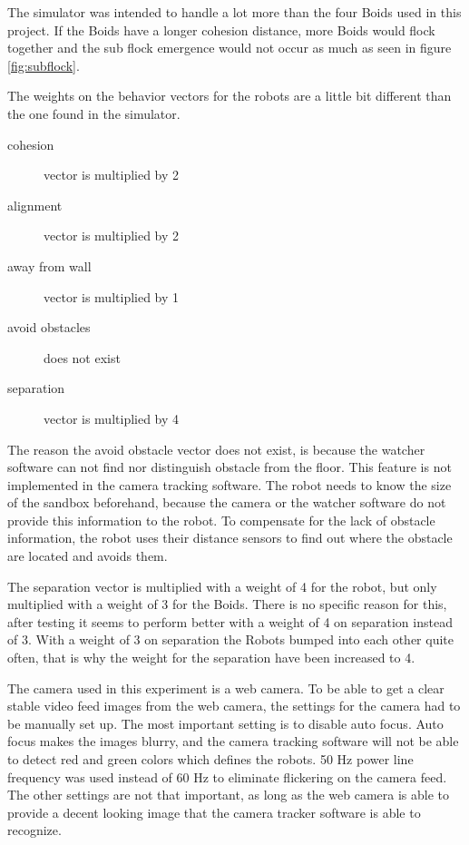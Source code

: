 The simulator was intended to handle a lot more than the four Boids used in this project. If the Boids have a longer cohesion distance, more Boids would flock together and the sub flock emergence would not occur as much as seen in figure \ref{fig:subflock}.

The weights on the behavior vectors for the robots are a little bit different than the one found in the simulator.
\begin{description}
\item[cohesion] vector is multiplied by 2
\item[alignment] vector is multiplied by 2
\item[away from wall] vector is multiplied by 1
\item[avoid obstacles] does not exist
\item[separation] vector is multiplied by 4
\end{description}

The reason the avoid obstacle vector does not exist, is because the watcher software can not find nor distinguish obstacle from the floor. This feature is not implemented in the camera tracking software. The robot needs to know the size of the sandbox beforehand, because the camera or the watcher software do not provide this information to the robot. To compensate for the lack of obstacle information, the robot uses their distance sensors to find out where the obstacle are located and avoids them.

The separation vector is multiplied with a weight of 4 for the robot, but only multiplied with a weight of 3 for the Boids. There is no specific reason for this, after testing it seems to perform better with a weight of 4 on separation instead of 3.
With a weight of 3 on separation the Robots bumped into each other quite often, that is why the weight for the separation have been increased to 4.

The camera used in this experiment is a web camera. To be able to get a clear stable video feed images from the web camera, the settings for the camera had to be manually set up.
The most important setting is to disable auto focus. Auto focus makes the images blurry, and the camera tracking software will not be able to detect red and green colors which defines the robots. 50 Hz power line frequency was used instead of 60 Hz to eliminate flickering on the camera feed. The other settings are not that important, as long as the web camera is able to provide a decent looking image that the camera tracker software is able to recognize.



